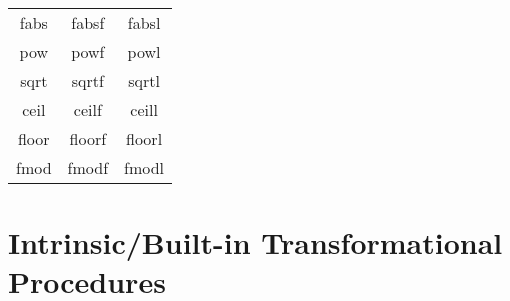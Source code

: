 \begin{table}[h]
\begin{center}
\begin{tabular}{c|c|c}
 fabs & fabsf & fabsl \\
 pow & powf & powl \\
 sqrt & sqrtf & sqrtl \\


 ceil & ceilf & ceill \\
 floor & floorf & floorl \\

 fmod & fmodf & fmodl \\ \hline
%
%

 \end{tabular} 
 \end{center}
\end{table}

\section{Intrinsic/Built-in Transformational Procedures}
\label{112125_19Sep13}

